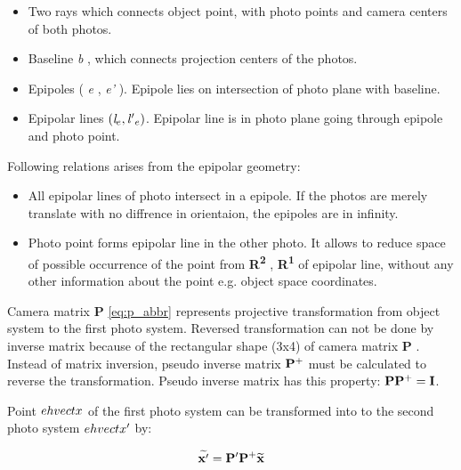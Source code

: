 \documentclass[a4paper,12pt]{article}
\newcommand{\ematr}[1]{
{\bf #1}
}
\newcommand{\ehvect}[1]{
{\bf \widetilde{#1}}
}
\newcommand{\escal}[1]{
{\it #1}
}
\newcommand{\eucl}[1]{
{\bf R\textsuperscript{#1}}
}
\begin{document}
\begin{itemize}
\item Two rays which connects object point, with photo points and camera centers of both photos.
\item Baseline \escal{b}, which connects projection centers of the photos.
\item Epipoles (\escal{e}, \escal{e'}). Epipole lies on intersection of photo plane with baseline.
\item Epipolar lines  $(\escal{l}_{e}, \escal{l'}_{e})$. Epipolar line is in photo plane going through epipole and photo point.
\end{itemize}


\noindent Following relations arises from the epipolar geometry:
\begin{itemize}
\item All epipolar lines of  photo intersect in a epipole. If the photos are merely translate with no diffrence in orientaion, 
the epipoles are in infinity.
\item Photo point forms epipolar line in the other photo. It allows to reduce space of possible occurrence of the point 
      from \eucl{2}, \eucl{1} of epipolar line, without any other information about the point e.g. object space coordinates. 
\end{itemize}



Camera matrix \ematr{P} \eqref{eq:p_abbr} represents projective transformation from object system to the first photo system.
Reversed transformation can not be done by inverse matrix because of the rectangular shape (3x4) of 
camera matrix \ematr{P}. Instead of matrix inversion,  pseudo inverse matrix $\ematr{P}^{+}$ must be 
calculated to reverse the transformation. Pseudo inverse matrix has this property: $\ematr{P}\ematr{P}^{+} = \ematr{I}$.


Point $\\ehvect{x}$ of the  first photo system  
can be transformed into  
to the second photo system $\\ehvect{x'}$
by:

\begin{equation}
\ehvect{x'} =  \ematr{P'}\ematr{P}^{+}\ehvect{x}
\end{equation}
\end{document}
